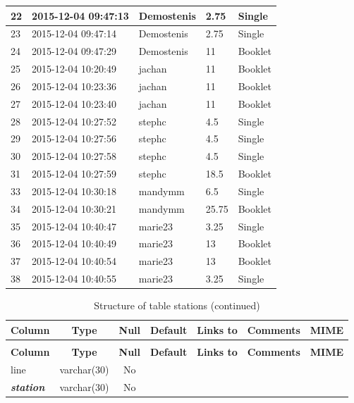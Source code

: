 \begin{longtable}{|l|l|l|l|l|}
22 & 2015-12-04 09:47:13 & Demostenis & 2.75 & Single \\ \hline 
23 & 2015-12-04 09:47:14 & Demostenis & 2.75 & Single \\ \hline 
24 & 2015-12-04 09:47:29 & Demostenis & 11 & Booklet \\ \hline 
25 & 2015-12-04 10:20:49 & jachan & 11 & Booklet \\ \hline 
26 & 2015-12-04 10:23:36 & jachan & 11 & Booklet \\ \hline 
27 & 2015-12-04 10:23:40 & jachan & 11 & Booklet \\ \hline 
28 & 2015-12-04 10:27:52 & stephc & 4.5 & Single \\ \hline 
29 & 2015-12-04 10:27:56 & stephc & 4.5 & Single \\ \hline 
30 & 2015-12-04 10:27:58 & stephc & 4.5 & Single \\ \hline 
31 & 2015-12-04 10:27:59 & stephc & 18.5 & Booklet \\ \hline 
33 & 2015-12-04 10:30:18 & mandymm & 6.5 & Single \\ \hline 
34 & 2015-12-04 10:30:21 & mandymm & 25.75 & Booklet \\ \hline 
35 & 2015-12-04 10:40:47 & marie23 & 3.25 & Single \\ \hline 
36 & 2015-12-04 10:40:49 & marie23 & 13 & Booklet \\ \hline 
37 & 2015-12-04 10:40:54 & marie23 & 13 & Booklet \\ \hline 
38 & 2015-12-04 10:40:55 & marie23 & 3.25 & Single \\ \hline 
 \end{longtable}

%
%
 \begin{longtable}{|l|c|c|c|l|l|l|} 
 \caption{Structure of table stations} \label{tab:stations-structure} \\
 \hline \multicolumn{1}{|c|}{\textbf{Column}} & \multicolumn{1}{|c|}{\textbf{Type}} & \multicolumn{1}{|c|}{\textbf{Null}} & \multicolumn{1}{|c|}{\textbf{Default}} & \multicolumn{1}{|c|}{\textbf{Links to}} & \multicolumn{1}{|c|}{\textbf{Comments}} & \multicolumn{1}{|c|}{\textbf{MIME}} \\ \hline \hline
\endfirsthead
 \caption{Structure of table stations (continued)} \\ 
 \hline \multicolumn{1}{|c|}{\textbf{Column}} & \multicolumn{1}{|c|}{\textbf{Type}} & \multicolumn{1}{|c|}{\textbf{Null}} & \multicolumn{1}{|c|}{\textbf{Default}} & \multicolumn{1}{|c|}{\textbf{Links to}} & \multicolumn{1}{|c|}{\textbf{Comments}} & \multicolumn{1}{|c|}{\textbf{MIME}} \\ \hline \hline \endhead \endfoot 
line & varchar(30) & No &  &  &  &  \\ \hline 
\textbf{\textit{station}} & varchar(30) & No &  &  &  &  \\ \hline 
 \end{longtable}

